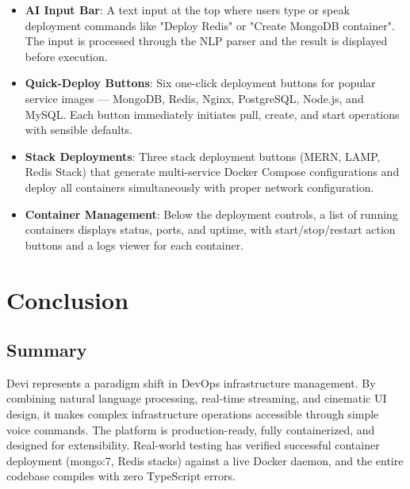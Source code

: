 \documentclass[12pt,a4paper]{report}
\begin{document}
\begin{itemize}
  \item \textbf{AI Input Bar}: A text input at the top where users type or speak deployment commands like "Deploy Redis" or "Create MongoDB container". The input is processed through the NLP parser and the result is displayed before execution.
  \item \textbf{Quick-Deploy Buttons}: Six one-click deployment buttons for popular service images --- MongoDB, Redis, Nginx, PostgreSQL, Node.js, and MySQL. Each button immediately initiates pull, create, and start operations with sensible defaults.
  \item \textbf{Stack Deployments}: Three stack deployment buttons (MERN, LAMP, Redis Stack) that generate multi-service Docker Compose configurations and deploy all containers simultaneously with proper network configuration.
  \item \textbf{Container Management}: Below the deployment controls, a list of running containers displays status, ports, and uptime, with start/stop/restart action buttons and a logs viewer for each container.
\end{itemize}

\chapter{Conclusion}

\section{Summary}
Devi represents a paradigm shift in DevOps infrastructure management. By combining natural language processing, real-time streaming, and cinematic UI design, it makes complex infrastructure operations accessible through simple voice commands. The platform is production-ready, fully containerized, and designed for extensibility. Real-world testing has verified successful container deployment (mongo:7, Redis stacks) against a live Docker daemon, and the entire codebase compiles with zero TypeScript errors.
\end{document}
